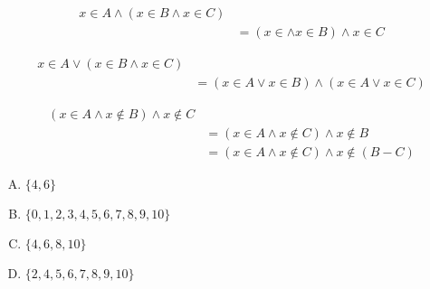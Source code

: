 {{        %
        \begin{practices}
            \begin{align*}
                x \in A \wedge (x \in B \wedge x \in C) \\
                &= (x \in \wedge x \in B) \wedge x \in C
            \end{align*}
        \end{practices}

        \begin{practices}
            \begin{align*}
                x \in A \vee (x \in B \wedge x \in C) \\
                &= (x \in A \vee x \in B) \wedge (x \in A \vee x \in C)
            \end{align*}
        \end{practices}

        \begin{practices}
            \begin{align*}
                (x \in A \wedge x \notin B) \wedge x \notin C \\
                &= (x \in A \wedge x \notin C) \wedge x \notin B \\
                &= (x \in A \wedge x \notin C) \wedge x \notin (B - C)
            \end{align*}
        \end{practices}

        \begin{practices}
            \begin{enumerate}[A.]
                \item $\{4, 6\}$
                \item $\{0, 1, 2, 3, 4, 5, 6, 7, 8, 9, 10\}$
                \item $\{4, 6, 8, 10\}$
                \item $\{2, 4, 5, 6, 7, 8, 9, 10\}$
            \end{enumerate}
        \end{practices}

        \begin{practices}

        \end{practices}

        \begin{practices}

        \end{practices}

}}
